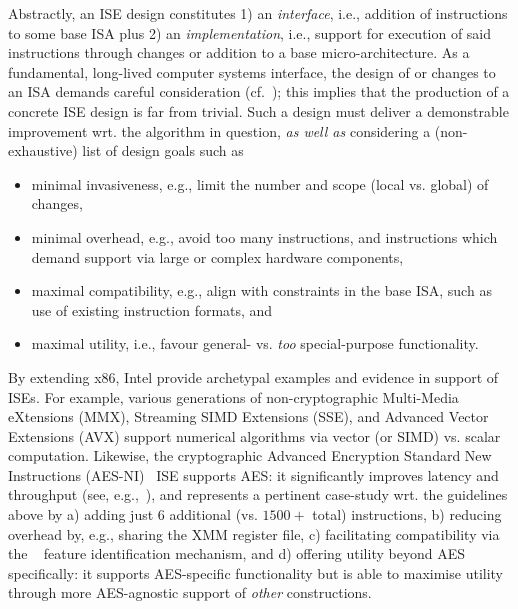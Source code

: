 Abstractly, an ISE design constitutes
1) an {\em interface},
   i.e., 
   addition of instructions to some 
   base ISA
   plus
2) an {\em implementation},
   i.e., 
   support for execution of said instructions through changes or addition 
   to a 
   base micro-architecture.
As a fundamental, long-lived computer systems interface, the design of or
changes to an ISA demands careful consideration
(cf.~\cite[Section 4]{Gueron:09}); this implies that the production of a 
concrete ISE design is far from trivial.  
Such a design must deliver a demonstrable improvement wrt. the algorithm in 
question, {\em as well as} considering a (non-exhaustive) list of design 
goals such as

\begin{itemize}
\item minimal invasiveness,
      e.g.,
      limit the number and scope (local vs. global) of changes,
\item minimal overhead,
      e.g.,
      avoid too many instructions, and instructions which demand support via large or complex hardware components,
\item maximal compatibility,
      e.g.,
      align with constraints in the base ISA, such as use of existing instruction formats,
      and
\item maximal       utility,
      i.e.,
      favour general- vs. {\em too} special-purpose functionality.
\end{itemize}

\noindent
By extending x86, Intel provide archetypal examples and evidence in support 
of ISEs.
For example, various generations of
non-cryptographic
Multi-Media      eXtensions (MMX),
Streaming SIMD  Extensions (SSE),
and
Advanced Vector Extensions (AVX)
support numerical algorithms via vector (or SIMD) vs. scalar computation.  
Likewise, the
    cryptographic
Advanced Encryption Standard New Instructions (AES-NI)~\cite{Gueron:09,DruGueKra:19}
ISE
supports AES: it significantly improves latency and throughput
(see, e.g.,~\cite{FazLopOli:18}),
and represents a pertinent case-study wrt. the guidelines above by
a) adding just $6$ additional (vs. $1500+$ total) instructions,
b) reducing overhead by, e.g., sharing the XMM register file,
c) facilitating compatibility via the
   ~\cite[Chapter 20]{X86:1:18}
   feature identification mechanism,
   and
d) offering utility beyond AES specifically:
   it supports AES-specific functionality but is able to maximise utility 
   through more AES-agnostic support of {\em other} constructions.

